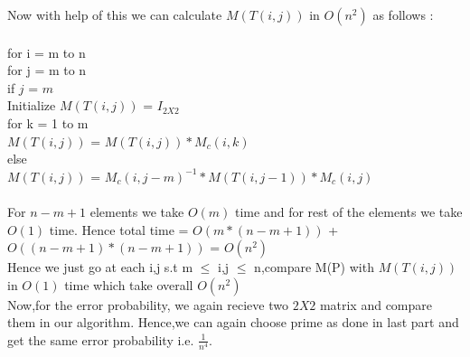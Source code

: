 \documentclass{article}
\begin{document}
Now with help of this we can calculate $M(T(i,j))$ in $O(n^{2})$ as follows : \\\\
for i = m to n \\
\hspace*{1cm}	for j = m to n \\ 
\hspace*{2cm}if $j$ = $m$ \\
\hspace*{3cm}	Initialize $M(T(i,j))$ = $I_{2X2}$ \\ 
\hspace*{3cm}	for k = 1 to m  \\ 
\hspace*{4cm}		$M(T(i,j))$ = $M(T(i,j)) * M_c(i,k)$ \\
\hspace*{2cm}else \\
\hspace*{3cm} $M(T(i,j))$ = $M_c(i,j-m)^{-1}*M(T(i,j-1))*M_c(i,j)$\\\\
For $n-m+1$ elements we take $O(m)$ time and for rest of the elements we take $O(1)$ time. Hence total time = $O(m*(n-m+1))$ + $O((n-m+1)*(n-m+1))$ = $O(n^{2})$\\ 
Hence we just go at each i,j s.t m $\leq$ i,j $\leq$ n,compare M(P) with $M(T(i,j))$ in $O(1)$ time which take overall $O(n^2)$ \\
Now,for the error probability, we again recieve two $2X2$ matrix and compare them in our algorithm. Hence,we can again choose prime as done in last part and get the same error probability i.e. $\frac{1}{n^4}$. \\
\end{document}
